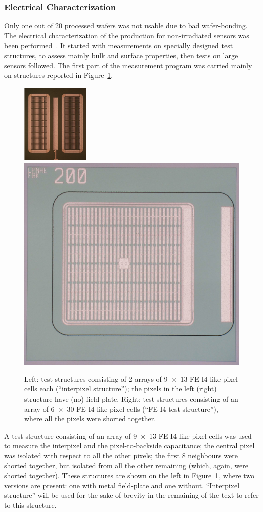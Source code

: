 \subsubsection{Electrical Characterization}
Only one out of 20 processed wafers was not usable due to bad wafer-bonding. The electrical characterization of the production for non-irradiated sensors was been performed~\cite{Bomben:2013cia}.
It started with measurements on specially designed test structures, to assess mainly bulk and surface 
properties, then tests on large sensors followed.
The first part of the measurement program was carried mainly on structures reported in Figure~\ref{fig:pix_cap_struct}.

 \begin{figure}[!htbp]
\begin{center}
\includegraphics[width=0.29\textwidth]{pixel_cap_struct.png}
\includegraphics[height=0.335\textwidth]{testStruct.png}
\caption{\label{fig:pix_cap_struct}Left: test structures consisting of 2 arrays of 9~$\times$~13 FE-I4-like pixel cells each (``interpixel structure'');
the pixels in the left (right) structure have (no) field-plate.
Right: test structures consisting of an array of 6~$\times$~30 FE-I4-like
 pixel cells (``FE-I4 test structure''), where  all the pixels were shorted together.}
\end{center}
\end{figure}

 A test structure consisting of an array
 of 9~$\times$~13 FE-I4-like pixel cells was used to measure the interpixel  and the pixel-to-backside capacitance; the central pixel was isolated with respect to all the other pixels;
 the first 8 neighbours were shorted together, but isolated from all the other remaining (which, again,  were shorted together). These structures are shown on the
 left in Figure~\ref{fig:pix_cap_struct}, where two versions are present: one with metal field-plate and one without. ``Interpixel structure'' will be used for the sake of
 brevity in the remaining of the text to refer to this structure.


